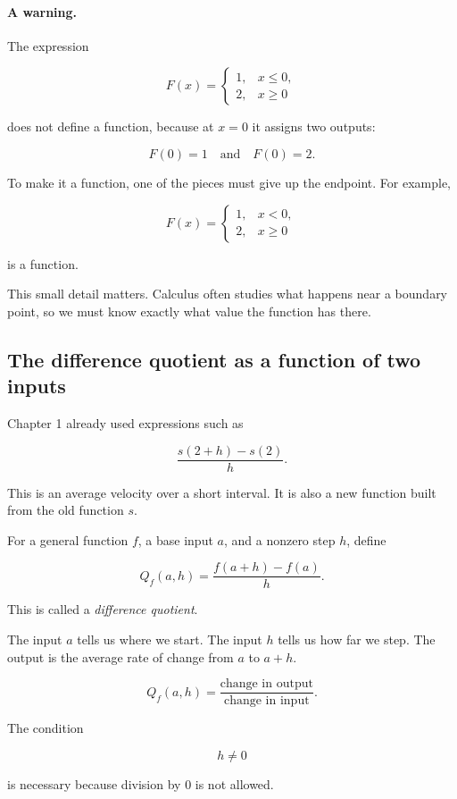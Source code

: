 \paragraph{A warning.}
The expression

\[
F(x)=
\begin{cases}
1, & x\le 0,\\
2, & x\ge 0
\end{cases}
\]

does not define a function, because at \(x=0\) it assigns two outputs:

\[
F(0)=1
\quad\text{and}\quad
F(0)=2.
\]

To make it a function, one of the pieces must give up the endpoint. For example,

\[
F(x)=
\begin{cases}
1, & x<0,\\
2, & x\ge 0
\end{cases}
\]

is a function.

This small detail matters. Calculus often studies what happens near a boundary point, so we must know exactly what value the function has there.

\subsection{The difference quotient as a function of two inputs}
\label{subsec:difference-quotient-function}

Chapter 1 already used expressions such as

\[
\frac{s(2+h)-s(2)}{h}.
\]

This is an average velocity over a short interval. It is also a new function built from the old function \(s\).

For a general function \(f\), a base input \(a\), and a nonzero step \(h\), define

\[
Q_f(a,h)=\frac{f(a+h)-f(a)}{h}.
\]

This is called a \emph{difference quotient}.

The input \(a\) tells us where we start. The input \(h\) tells us how far we step. The output is the average rate of change from \(a\) to \(a+h\).

\[
Q_f(a,h)
=
\frac{\text{change in output}}{\text{change in input}}.
\]

The condition

\[
h\neq 0
\]

is necessary because division by \(0\) is not allowed.


